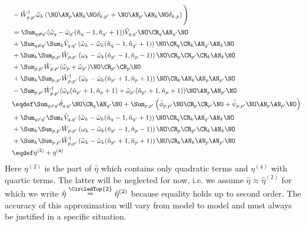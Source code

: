 \begin{appendix}
\begin{align}
&-\hat W_{p,p^\prime}^\dagger \hat\omega_k\left(\NO\AN_p\AN_k\NO\delta_{k,p^\prime}+\NO\AN_{p^\prime}\AN_k\NO\delta_{k,p}\right)\Bigg) \nonumber \\ \quad&
= \Sum_{q\neq q^\prime}(\hat\omega_q-\hat\omega_{q^\prime}(\hat n_q-1,\hat n_{q^\prime}+1))\hat V_{q,q^\prime}\NO\CR_q\AN_{q^\prime}\NO \nonumber \\\quad&
+\Sum_{q\neq q^\prime}\Sum_k \hat V_{q,q^\prime} \left(\hat\omega_k - \hat\omega_k(\hat n_q-1,\hat n_{q^\prime}+1)\right)\NO \CR_q\CR_k\AN_{q^\prime}\AN_k\NO \nonumber \\\quad&
+ \Sum_k\Sum_{p,p^\prime}\hat W_{p,p^\prime} \left(\omega_k-\hat\omega_k(\hat n_{p^\prime}-1,\hat n_p -1)\right)\NO \CR_p\CR_{p^\prime}\CR_k\AN_k\NO \nonumber \\\quad& 
+ \Sum_{p,p^\prime}\hat W_{p,p^\prime}(\hat\omega_p+\hat\omega_{p^\prime}) \NO\CR_{p^\prime}\CR_p\NO\nonumber\\ \quad& 
+ \Sum_k\Sum_{p,p^\prime}\hat W_{p,p^\prime}^\dagger \left(\hat\omega_k-\hat\omega_k(\hat n_{p^\prime}+1,\hat n_p +1)\right)\NO \CR_k\AN_k\AN_p\AN_{p^\prime}\NO\nonumber \\ \quad&
-\Sum_{p,p^\prime} \hat W_{p,p^\prime}^\dagger (\hat\omega_p(\hat n_{p^\prime}+1,\hat n_p +1)+\hat\omega_{p^\prime}(\hat n_{p^\prime}+1,\hat n_p +1))\NO\AN_p\AN_{p^\prime}\NO\nonumber \\ \quad&
\eqdef \Sum_{q\neq q^\prime}\hat \theta_{q,q^\prime}\NO \CR_q\AN_{q^\prime}\NO+\Sum_{p,p^\prime}\left(\hat \phi_{p,p^\prime}\NO \CR_p\CR_{p^\prime}\NO+\hat \psi_{p,p^\prime}\NO\AN_p\AN_{p^\prime}\NO\right)\label{psiphitheta_def} \\ \quad&
+\Sum_{q\neq q^\prime}\Sum_k \hat V_{q,q^\prime} \left(\hat\omega_k - \hat\omega_k(\hat n_q-1,\hat n_{q^\prime}+1)\right)\NO \CR_q\CR_k\AN_{q^\prime}\AN_k\NO \nonumber \\\quad&
+ \Sum_k\Sum_{p,p^\prime}\hat W_{p,p^\prime} \left(\omega_k-\hat\omega_k(\hat n_{p^\prime}-1,\hat n_p -1)\right)\NO \CR_p\CR_{p^\prime}\CR_k\AN_k\NO \nonumber \\\quad& 
+ \Sum_k\Sum_{p,p^\prime}\hat W_{p,p^\prime}^\dagger \left(\hat\omega_k-\hat\omega_k(\hat n_{p^\prime}+1,\hat n_p +1)\right)\NO \CR_k\AN_k\AN_p\AN_{p^\prime}\NO\nonumber \\ \quad&
\eqdef \eta^{(2)}+\eta^{(4)}
\end{align}
Here $\eta^{(2)}$ is the part of $\hat\eta$ which contains only quadratic terms and $\eta^{(4)}$ with quartic terms. The latter will be neglected for now, i.e. we assume $\hat\eta\approx\hat\eta^{(2)}$ for which we write $\hat\eta\overset{\CircledTop{2}}{=}\hat\eta^{(2)}$ because equality holds up to second order. The accuracy of this approximation will vary from model to model and must always be justified in a specific situation.

\end{appendix}
